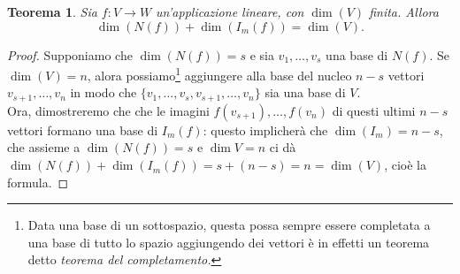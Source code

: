 \documentclass{book}
\newtheorem{teorema}{Teorema}
\begin{document}
\begin{teorema}
  Sia $f:V\to W$ un'applicazione lineare, con $\dim (V)$ finita. Allora
  \begin{equation}
    \dim (N(f))+\dim(I_m(f))=\dim(V).
  \end{equation}
\end{teorema}
\begin{proof}
  Supponiamo che $\dim(N(f))=s$ e sia $v_1,\dots,v_s$ una base di $N(f)$. Se $\dim (V)=n$, alora
  possiamo\footnote{Data una base di un sottospazio, questa possa sempre essere completata a una base di tutto
    lo spazio aggiungendo dei vettori è in effetti un teorema detto {\it teorema del completamento.}} aggiungere
  alla base del nucleo $n-s$ vettori $v_{s+1},\dots,v_n$ in modo che $\{v_1,\dots,v_s,v_{s+1},\dots,v_n\}$ sia una
  base di $V$.\\
  Ora, dimostreremo che che le imagini $f(v_{s+1}),\dots,f(v_n)$ di questi ultimi $n-s$ vettori formano una base
  di $I_m(f)$: questo implicherà che $\dim(I_m)=n-s$, che assieme a $\dim(N(f))=s$ e $\dim{V}=n$ ci dà
  $\dim(N(f))+\dim(I_m(f))=s+(n-s)=n=\dim(V)$, cioè la formula.
\end{proof}
\end{document}
